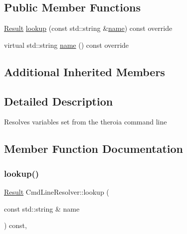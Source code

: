 \subsection*{Public Member Functions}
\begin{DoxyCompactItemize}
\item 
\hyperlink{classtheoria_1_1config_1_1ConfigVariableResolver_af27a85262d802c9ad4ecb1179efaf447}{Result} \hyperlink{classtheoria_1_1config_1_1CmdLineResolver_a6de270bd5855361b368cc082df53a527}{lookup} (const std\+::string \&\hyperlink{classtheoria_1_1config_1_1CmdLineResolver_ab42f0d86e62e985ee0bc94947df46a74}{name}) const override
\item 
virtual std\+::string \hyperlink{classtheoria_1_1config_1_1CmdLineResolver_ab42f0d86e62e985ee0bc94947df46a74}{name} () const override
\end{DoxyCompactItemize}
\subsection*{Additional Inherited Members}


\subsection{Detailed Description}
Resolves variables set from the theroia command line 

\subsection{Member Function Documentation}
\mbox{\label{classtheoria_1_1config_1_1CmdLineResolver_a6de270bd5855361b368cc082df53a527}} 
\subsubsection{\texorpdfstring{lookup()}{lookup()}}
{\footnotesize\ttfamily \hyperlink{classtheoria_1_1config_1_1ConfigVariableResolver_af27a85262d802c9ad4ecb1179efaf447}{Result} Cmd\+Line\+Resolver\+::lookup (\begin{DoxyParamCaption}\item[{const std\+::string \&}]{name }\end{DoxyParamCaption}) const\hspace{0.3cm}{\ttfamily [override]}, {\ttfamily [virtual]}}

